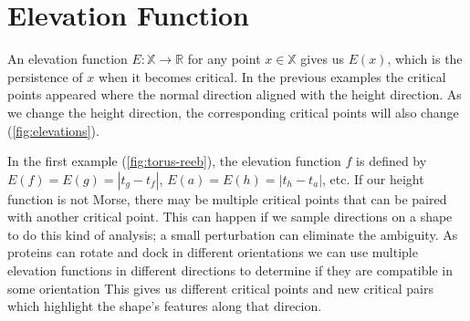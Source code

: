 \documentclass{article}
\begin{document}
\section{Elevation Function}

An elevation function $E:\mathbb{X}\to\mathbb{R}$ for any point $x\in\mathbb{X}$ gives us $E(x)$, which is the persistence of $x$ when it becomes critical. In the previous examples the critical points appeared where the normal direction aligned with the height direction. As we change the height direction, the corresponding
critical points will also change (\cref{fig:elevations}).

In the first example (\cref{fig:torus-reeb}), the elevation function $f$ is defined by $E(f)=E(g)=|t_g-t_f|$, $E(a)=E(h)=|t_h-t_a|$, etc. If our height function is not Morse, there may be multiple critical points that can be paired with another critical point. This can happen if we sample directions on a shape to do this kind of analysis; a small perturbation can eliminate the ambiguity.
As proteins can rotate and dock in different orientations we can use multiple elevation functions
in different directions to determine if they are compatible in some orientation
This gives us different critical points and new critical pairs which highlight the shape's features along that direcion.
\end{document}
